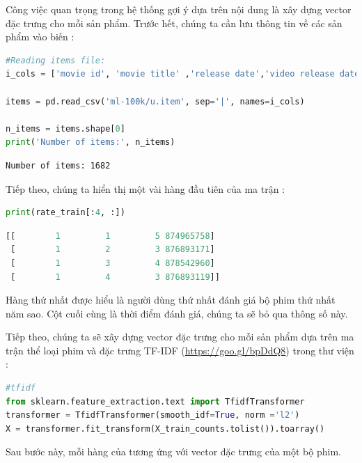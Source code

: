 Công việc quan trọng trong hệ thống gợi ý dựa trên nội dung là xây dựng
vector đặc trưng cho mỗi sản phẩm. Trước hết,
chúng ta
cần lưu thông tin về các sản phẩm vào biến :
\begin{lstlisting}[language=Python]
#Reading items file:
i_cols = ['movie id', 'movie title' ,'release date','video release date', 'IMDb URL', 'unknown', 'Action', 'Adventure', 'Animation', 'Children\'s', 'Comedy', 'Crime', 'Documentary', 'Drama', 'Fantasy', 'Film-Noir', 'Horror', 'Musical', 'Mystery', 'Romance', 'Sci-Fi', 'Thriller', 'War', 'Western']

items = pd.read_csv('ml-100k/u.item', sep='|', names=i_cols) 

n_items = items.shape[0]
print('Number of items:', n_items)
\end{lstlisting}
\kq 
\begin{lstlisting}
Number of items: 1682 
\end{lstlisting}
Tiếp theo, chúng ta hiển thị một vài hàng đầu tiên của ma trận
:
\begin{lstlisting}[language=Python]
print(rate_train[:4, :])
\end{lstlisting}
\kq 
\begin{lstlisting}[language=Python]
[[        1         1         5 874965758]
 [        1         2         3 876893171]
 [        1         3         4 878542960]
 [        1         4         3 876893119]]
\end{lstlisting}
Hàng thứ nhất được hiểu là người dùng thứ nhất đánh giá bộ phim thứ
nhất năm sao. Cột cuối cùng là thời điểm đánh giá, chúng ta sẽ bỏ qua
thông số này.

Tiếp theo, chúng ta sẽ xây dựng vector đặc trưng cho mỗi sản phẩm dựa trên ma trận thể loại phim và đặc trưng {TF-IDF} (\url{https://goo.gl/bpDdQ8}) trong thư viện :
\begin{lstlisting}[language=Python]
#tfidf 
from sklearn.feature_extraction.text import TfidfTransformer 
transformer = TfidfTransformer(smooth_idf=True, norm ='l2') 
X = transformer.fit_transform(X_train_counts.tolist()).toarray() 
\end{lstlisting}
 
Sau bước này, mỗi hàng của  tương ứng với vector đặc trưng của
một bộ phim.
 
